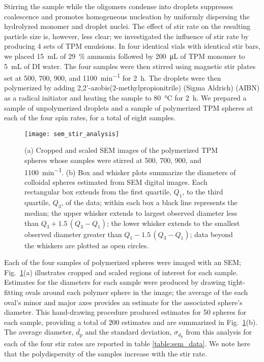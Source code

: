 Stirring the sample while the oligomers condense into droplets suppresses coalescence and
promotes homogeneous nucleation by uniformly dispersing the hydrolyzed monomer and droplet
nuclei. %
The effect of stir rate on the resulting particle size is, however, less clear;
we investigated the influence of stir rate by producing \num{4} sets of TPM emulsions.
In four identical vials with identical stir bars, we placed \SI{15}{\milli\liter} of 
\SI{29}{\percent} ammonia followed by \SI{200}{\micro\liter} of TPM 
monomer to \SI{5}{\milli\liter} of DI water. The four samples were then stirred 
using magnetic stir plates set at \num{500}, \num{700}, \num{900}, and
\SI{1100}{\minute^{-1}} for \SI{2}{\hour}. 
The droplets were then polymerized by adding
\num{2},\num{2}'-azobis(\num{2}-methylpropionitrile) (Sigma Aldrich) (AIBN)
as a radical initiator and %
heating the sample to \SI{80}{\celsius} for \SI{2}{\hour}.
We prepared a sample of unpolymerized droplets and a sample of polymerized TPM spheres
at each of the four spin rates, for a total of eight samples.

\begin{figure}
    \centering
    \texttt{[image: sem\_stir\_analysis]}
    \caption{(a) Cropped and scaled SEM images of the polymerized TPM spheres whose
      samples were stirred at \num{500}, \num{700}, \num{900}, and \SI{1100}{\minute^{-1}}.
      (b)  Box and whisker plots summarize the diameters of colloidal spheres estimated from
      SEM digital images. Each rectangular box extends from the first quartile, $Q_1$, to
      the third quartile, $Q_3$, of the data; within each box a black line represents the median;
      the upper whisker extends to largest observed diameter less than $Q_3 + 1.5\, (Q_3 - Q_1)$;
      the lower whisker extends to the smallest observed diameter greater than $Q_1 - 1.5\, (Q_3 - Q_1)$;
      data beyond the whiskers are plotted as open circles. }
    \label{fig:sem_stir_rate}
\end{figure}

Each of the four samples of polymerized spheres were imaged with an SEM;
Fig.~\ref{fig:sem_stir_rate}(a) illustrates cropped and scaled regions of interest
for each sample. Estimates for the diameters for each sample
were produced by drawing tight-fitting ovals around each polymer sphere in the image;
the average of the each oval's minor and major axes provides an estimate for the
associated sphere's diameter. This hand-drawing procedure produced estimates
for \num{50} spheres for each sample, providing a total of \num{200} estimates
and are summarized in Fig.~\ref{fig:sem_stir_rate}(b). The average 
diameter, $\bar{d_{\text{p}}}$ and the standard deviation, $\sigma_{d_{\text{p}}}$
from this analysis for each of the four stir rates are reported
in table \ref{table:sem_data}. We note here that the polydispersity of the 
samples increase with the stir rate.

